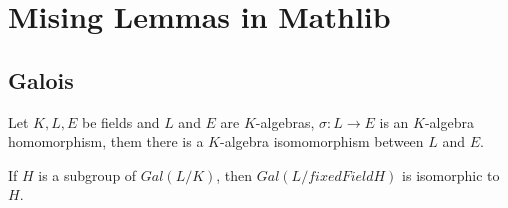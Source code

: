 \chapter{Mising Lemmas in Mathlib}

\section{Galois}

\begin{lemma}
	\leanok
	Let $ K, L, E $ be fields and $ L $ and $ E $ are $ K $-algebras, $\sigma : L \to E $ is an $ K $-algebra homomorphism, them there is a $ K $-algebra isomomorphism between $ L $ and $ E $.
\end{lemma}

\begin{lemma}
	\lean{}
	\leanok
\end{lemma}

\begin{theorem}
	\leanok
	If $H$ is a subgroup of $Gal(L/K)$, then $Gal(L / fixedField H)$ is isomorphic to $H$.
\end{theorem}